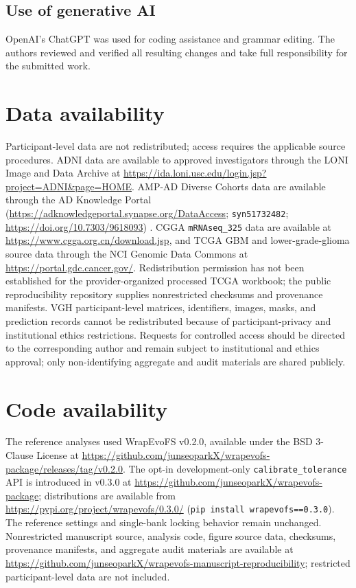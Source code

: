 \subsection{Use of generative AI}

OpenAI's ChatGPT was used for coding assistance and grammar editing. The authors reviewed and verified all resulting changes and take full responsibility for the submitted work.

\FloatBarrier
\section{Data availability}

Participant-level data are not redistributed; access requires the applicable source procedures. ADNI data are available to approved investigators through the LONI Image and Data Archive at \url{https://ida.loni.usc.edu/login.jsp?project=ADNI&page=HOME}. AMP-AD Diverse Cohorts data are available through the AD Knowledge Portal (\url{https://adknowledgeportal.synapse.org/DataAccess}; \texttt{syn51732482}; \url{https://doi.org/10.7303/9618093}) \citep{ref52}. CGGA \texttt{mRNAseq\_325} data are available at \url{https://www.cgga.org.cn/download.jsp}, and TCGA GBM and lower-grade-glioma source data through the NCI Genomic Data Commons at \url{https://portal.gdc.cancer.gov/}. Redistribution permission has not been established for the provider-organized processed TCGA workbook; the public reproducibility repository supplies nonrestricted checksums and provenance manifests. VGH participant-level matrices, identifiers, images, masks, and prediction records cannot be redistributed because of participant-privacy and institutional ethics restrictions. Requests for controlled access should be directed to the corresponding author and remain subject to institutional and ethics approval; only non-identifying aggregate and audit materials are shared publicly.

\FloatBarrier
{}
\section{Code availability}

The reference analyses used WrapEvoFS v0.2.0, available under the BSD 3-Clause License at \url{https://github.com/junseoparkX/wrapevofs-package/releases/tag/v0.2.0}. The opt-in development-only \texttt{calibrate\_tolerance} API is introduced in v0.3.0 at \url{https://github.com/junseoparkX/wrapevofs-package}; distributions are available from \url{https://pypi.org/project/wrapevofs/0.3.0/} (\texttt{pip install wrapevofs==0.3.0}). The reference settings and single-bank locking behavior remain unchanged. Nonrestricted manuscript source, analysis code, figure source data, checksums, provenance manifests, and aggregate audit materials are available at \url{https://github.com/junseoparkX/wrapevofs-manuscript-reproducibility}; restricted participant-level data are not included.
